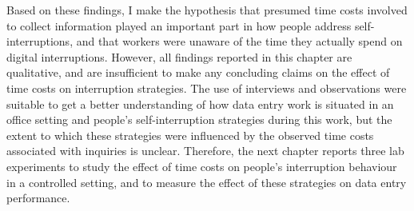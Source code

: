 Based on these findings, I make the hypothesis that presumed time costs involved to collect information played an important part in how people address self-interruptions, and that workers were unaware of the time they actually spend on digital interruptions. However, all findings reported in this chapter are qualitative, and are insufficient to make any concluding claims on the effect of time costs on interruption strategies. The use of interviews and observations were suitable to get a better understanding of how data entry work is situated in an office setting and people's self-interruption strategies during this work, but the extent to which these strategies were influenced by the observed time costs associated with inquiries is unclear. Therefore, the next chapter reports three lab experiments to study the effect of time costs on people's interruption behaviour in a controlled setting, and to measure the effect of these strategies on data entry performance.

